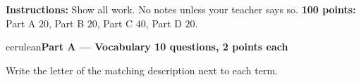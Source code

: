 \documentclass[10pt]{article}
\newcommand{\parthead}[1]{%
  \vspace{6pt}\noindent
  {\tcbset{after={\par\nopagebreak}}%
   \begin{headlinebox}{cerulean}{\color{white}\bfseries #1}\end{headlinebox}}%
  \nopagebreak\vspace{4pt}}
\begin{document}

\vspace{0.06in}
\noindent\textbf{Instructions:} Show all work. No notes unless your teacher says so.
\textbf{100 points:} Part A $20$, Part B $20$, Part C $40$, Part D $20$.

\parthead{Part A --- Vocabulary \hfill 10 questions, 2 points each}

\small
Write the letter of the matching description next to each term.
\end{document}
